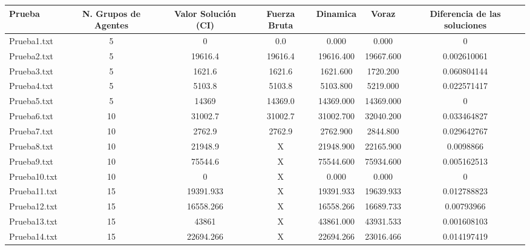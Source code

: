 \documentclass[11pt,letter]{article}
\begin{document}
\begin{table}[H]
\centering
\begin{adjustbox}{width=\textwidth}
\begin{tabular}{|l|c|c|c|c|c|c|}
\hline
Prueba & N. Grupos de Agentes & Valor Solución (CI) & Fuerza Bruta & Dinamica & Voraz & Diferencia de las soluciones \\
\hline
Prueba1.txt & 5 & 0 & \cellcolor{verde}0.0 & \cellcolor{verde}0.000 & \cellcolor{verde}0.000 & 0 \\
\hline
Prueba2.txt & 5 & 19616.4 & \cellcolor{verde}19616.4 & \cellcolor{verde}19616.400 & \cellcolor{rosado}19667.600 & 0.002610061 \\
\hline
Prueba3.txt & 5 & 1621.6 & \cellcolor{verde}1621.6 & \cellcolor{verde}1621.600 & \cellcolor{rosado}1720.200 & 0.060804144 \\
\hline
Prueba4.txt & 5 & 5103.8 & \cellcolor{verde}5103.8 & \cellcolor{verde}5103.800 & \cellcolor{rosado}5219.000 & 0.022571417 \\
\hline
Prueba5.txt & 5 & 14369 & \cellcolor{verde}14369.0 & \cellcolor{verde}14369.000 & \cellcolor{verde}14369.000 & 0 \\
\hline
Prueba6.txt & 10 & 31002.7 & \cellcolor{verde}31002.7 & \cellcolor{verde}31002.700 & \cellcolor{rosado}32040.200 & 0.033464827 \\
\hline
Prueba7.txt & 10 & 2762.9 & \cellcolor{verde}2762.9 & \cellcolor{verde}2762.900 & \cellcolor{rosado}2844.800 & 0.029642767 \\
\hline
Prueba8.txt & 10 & 21948.9 & \cellcolor{rosado}X & \cellcolor{verde}21948.900 & \cellcolor{rosado}22165.900 & 0.0098866 \\
\hline
Prueba9.txt & 10 & 75544.6 & \cellcolor{rosado}X & \cellcolor{verde}75544.600 & \cellcolor{rosado}75934.600 & 0.005162513 \\
\hline
Prueba10.txt & 10 & 0 & \cellcolor{rosado}X & \cellcolor{verde}0.000 & \cellcolor{verde}0.000 & 0 \\
\hline
Prueba11.txt & 15 & 19391.933 & \cellcolor{rosado}X & \cellcolor{verde}19391.933 & \cellcolor{rosado}19639.933 & 0.012788823 \\
\hline
Prueba12.txt & 15 & 16558.266 & \cellcolor{rosado}X & \cellcolor{verde}16558.266 & \cellcolor{rosado}16689.733 & 0.00793966 \\
\hline
Prueba13.txt & 15 & 43861 & \cellcolor{rosado}X & \cellcolor{verde}43861.000 & \cellcolor{rosado}43931.533 & 0.001608103 \\
\hline
Prueba14.txt & 15 & 22694.266 & \cellcolor{rosado}X & \cellcolor{verde}22694.266 & \cellcolor{rosado}23016.466 & 0.014197419 \\

\end{tabular}
\end{adjustbox}
\end{table}
\end{document}
